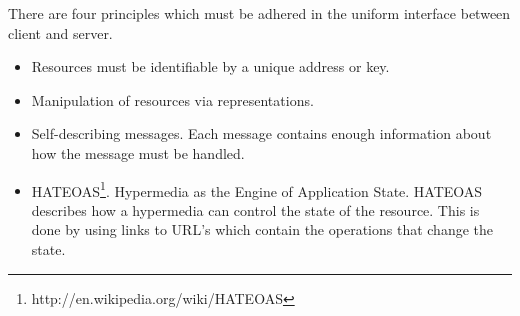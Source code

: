 There are four principles which must be adhered in the uniform interface between client and server.
\begin{itemize}
\item Resources must be identifiable by a unique address or key.
\item Manipulation of resources via representations.
\item Self-describing messages. Each message contains enough information about how the message must be handled.
\item HATEOAS\footnote{http://en.wikipedia.org/wiki/HATEOAS}. Hypermedia as the Engine of Application State. HATEOAS describes how a hypermedia can control the state of the resource. This is done by using links to URL’s which contain the operations that change the state.
\end{itemize} 